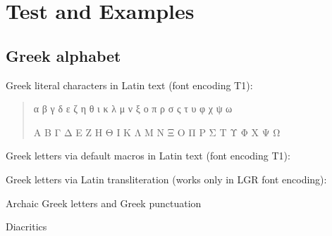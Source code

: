 \documentclass[a4paper, parskip=true]{scrartcl}
\newcommand*{\latinencoding}{T1}
\begin{document}
\section{Test and Examples}

\subsection{Greek alphabet}

Greek literal characters in Latin text (font encoding \latinencoding):
\begin{quote}
  α β γ δ ε ζ η θ ι κ λ μ ν ξ ο π ρ σ ς τ υ φ χ ψ ω

  Α Β Γ Δ Ε Ζ Η Θ Ι Κ Λ Μ Ν Ξ Ο Π Ρ Σ   Τ Υ Φ Χ Ψ Ω
\end{quote}
%
Greek letters via default macros in Latin text (font encoding \latinencoding):
%
\newcommand*{\greekAlphabetsample}{
  \textAlpha{} \textBeta{} \textGamma{} \textDelta{} \textEpsilon{}
  \textZeta{} \textEta{} \textTheta{} \textIota{} \textKappa{}
  \textLambda{} \textMu{} \textNu{} \textXi{} \textOmicron{} \textPi{}
  \textRho{} \textSigma{} \textTau{} \textUpsilon{} \textPhi{}
  \textChi{} \textPsi{} \textOmega{}
  }
\newcommand*{\greekalphabetsample}{
  \textalpha{} \textbeta{} \textgamma{} \textdelta{} \textepsilon{}
  \textzeta{} \texteta{} \texttheta{} \textiota{} \textkappa{}
  \textlambda{} \textmu{} \textnu{} \textxi{} \textomicron{} \textpi{}
  \textrho{} \textsigma{} \textvarsigma{} \texttau{} \textupsilon{}
  \textphi{} \textchi{} \textpsi{} \textomega{}
}
\begin{quote}
  \greekalphabetsample

  \greekAlphabetsample
\end{quote}
%
\ifdefined\UnicodeEncodingName
\else
  Greek letters via Latin transliteration (works only in LGR font encoding):
  \begin{quote}

  \end{quote}
\fi
%
Archaic Greek letters and Greek punctuation

\newcommand*{\archaicgreeksample}{
  \textdigamma \textDigamma{}
  \textkoppa   \textKoppa{}
  \textqoppa   \textQoppa{}
  \textsampi   \textSampi{}
  \textstigma
  \textvarstigma %
  \textStigma{}
  \textanoteleia{}
  \texterotimatiko{}
  \textdexiakeraia{}
  \textaristerikeraia{}
}
\begin{quote}
  \archaicgreeksample
\end{quote}
%
Diacritics
\end{document}
